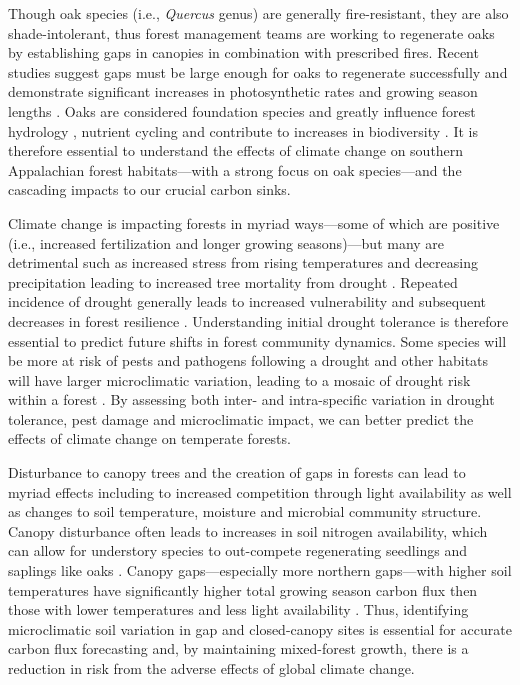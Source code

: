 \documentclass[11pt]{article}\usepackage[]{graphicx}\usepackage[]{color}
\begin{document}
Though oak species (i.e., \textit{Quercus} genus) are generally fire-resistant, they are also shade-intolerant, thus forest management teams are working to regenerate oaks by establishing gaps in canopies in combination with prescribed fires. Recent studies suggest gaps must be large enough for oaks to regenerate successfully and demonstrate significant increases in photosynthetic rates and growing season lengths \citep{Zhang2020}. Oaks are considered foundation species \citep{Ellison2005, Mitchell2019} and greatly influence forest hydrology \citep{Arthur2012}, nutrient cycling \citep{Arthur2012} and contribute to increases in biodiversity \citep{Mitchell2019, Izbicki2020}. It is therefore essential to understand the effects of climate change on southern Appalachian forest habitats---with a strong focus on oak species---and the cascading impacts to our crucial carbon sinks. 
  
Climate change is impacting forests in myriad ways---some of which are positive (i.e., increased  fertilization and longer growing seasons)---but many are detrimental such as increased stress from rising temperatures and decreasing precipitation leading to increased tree mortality from drought \citep{Ayers2000, Bachelet2001, Lloyd2007, Allen2010}. Repeated incidence of drought generally leads to increased vulnerability and subsequent decreases in forest resilience \citep{Allen2010,Anderegg2020}. Understanding initial drought tolerance is therefore essential to predict future shifts in forest community dynamics. Some species will be more at risk of pests and pathogens following a drought and other habitats will have larger microclimatic variation, leading to a mosaic of drought risk within a forest \citep{Ayers2000,Anderegg2020}. By assessing both inter- and intra-specific variation in drought tolerance, pest damage and microclimatic impact, we can better predict the effects of climate change on temperate forests. 
  
Disturbance to canopy trees and the creation of gaps in forests can lead to myriad effects including to increased competition through light availability as well as changes to soil temperature, moisture and microbial community structure. Canopy disturbance often leads to increases in soil nitrogen availability, which can allow for understory species to out-compete regenerating seedlings and saplings like oaks \citep{Taylor2016, Mladenoff1987}. Canopy gaps---especially more northern gaps---with higher soil temperatures have significantly higher total growing season carbon flux then those with lower temperatures and less light availability \citep{Schatz2012, Raymond2006}. Thus, identifying microclimatic soil variation in gap and closed-canopy sites is essential for accurate carbon flux forecasting and, by maintaining mixed-forest growth, there is a reduction in risk from the adverse effects of global climate change. \\
\end{document}
